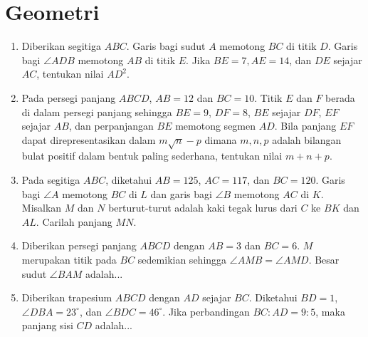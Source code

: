 \documentclass[11pt]{scrartcl}
\begin{document}
\section{Geometri}
\begin{enumerate}[resume]
		\item
		Diberikan segitiga $ABC$. Garis bagi sudut $A$ memotong $BC$ di titik $D$. Garis bagi
		$\angle ADB$ memotong $AB$ di titik $E$. Jika $BE = 7, AE = 14$, dan $DE$ sejajar $AC$,
		tentukan nilai $AD^2$.


		\item
		Pada persegi panjang $ABCD$, $AB = 12$ dan $BC=10$. Titik $E$ dan $F$ berada di dalam persegi panjang sehingga $BE=9$, $DF=8$, $BE$ sejajar $DF$, $EF$ sejajar $AB$, dan perpanjangan $BE$ memotong segmen $AD$. Bila panjang $EF$ dapat direpresentasikan dalam $m\sqrt n - p$ dimana $m,n,p$ adalah bilangan bulat positif dalam bentuk paling sederhana, tentukan nilai $m+n+p$.

	\item
	Pada segitiga $ABC$, diketahui $AB=125$, $AC=117$, dan $BC=120$. Garis bagi $\angle A$ memotong $BC$ di $L$ dan garis bagi $\angle B$ memotong $AC$ di $K$. Misalkan $M$ dan $N$ berturut-turut adalah kaki tegak lurus dari $C$ ke $BK$ dan $AL$. Carilah panjang $MN$.


		\item Diberikan persegi panjang $ABCD$ dengan $AB = 3$ dan $BC = 6$. $M$ merupakan titik pada $BC$ sedemikian sehingga $\angle AMB = \angle AMD$. Besar sudut $\angle BAM$ adalah...

  		\item
		Diberikan trapesium $ABCD$ dengan $AD$ sejajar $BC$. Diketahui $BD=1$, $\angle DBA = 23^\circ$, dan $\angle BDC = 46^\circ$. Jika perbandingan $BC:AD=9:5$, maka panjang sisi $CD$ adalah...
\end{enumerate}
	
	
\end{document}

